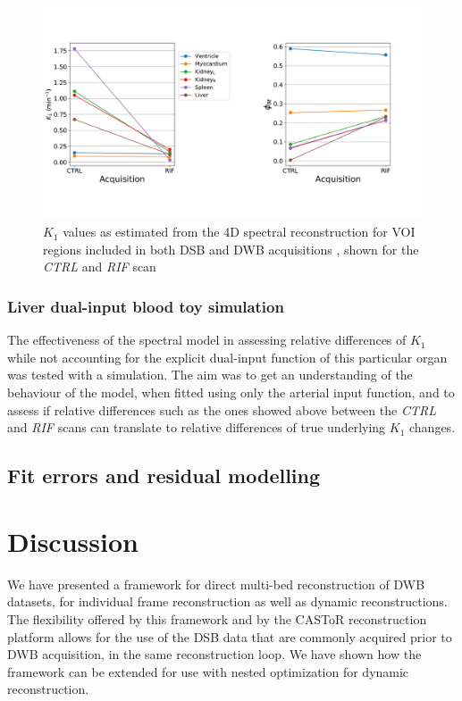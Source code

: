 \begin{figure} [h!]
\centering
\includegraphics[scale=0.5,angle=0]{3_Results/3_3_DWB_Reconstruction/figures/K1_VB_drop.pdf}
\caption{$K_1$ values as estimated from the 4D spectral reconstruction for VOI regions included in both DSB and DWB acquisitions , shown for the \textit{CTRL} and \textit{RIF} scan}
\label{fig_3_3:IsotoPK_K1_drop}
\end{figure} 

\subsubsection{Liver dual-input blood toy simulation}
The effectiveness of the spectral model in assessing relative differences of $K_1$ while not accounting for the explicit dual-input function of this particular organ was tested with a simulation. The aim was to get an understanding of the behaviour of the model, when fitted using only the arterial input function, and to assess if relative differences such as the ones showed above between the \textit{CTRL} and \textit{RIF} scans can translate to relative differences of true underlying $K_1$ changes. 

\subsection{Fit errors and residual modelling}
\label{sub_section:residuals}


\newpage
\newpage
\newpage
\section{Discussion}

We have presented a framework for direct multi-bed reconstruction of DWB datasets, for individual frame reconstruction as well as dynamic reconstructions. The flexibility offered by this framework and by the CASToR reconstruction platform allows for the use of the DSB data that are commonly acquired prior to DWB acquisition, in the same reconstruction loop. We have shown how the framework can be extended for use with nested optimization for dynamic reconstruction.

